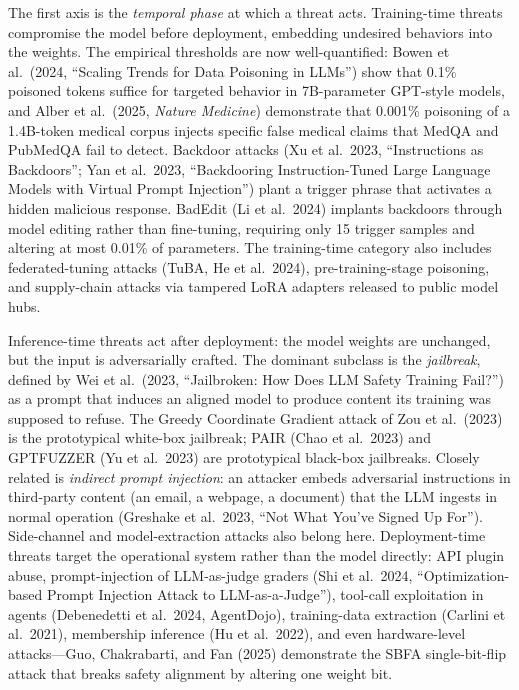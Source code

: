 The first axis is the \emph{temporal phase} at which a threat acts. Training-time threats compromise the model before deployment, embedding undesired behaviors into the weights. The empirical thresholds are now well-quantified: Bowen et al.~(2024, ``Scaling Trends for Data Poisoning in LLMs'') show that 0.1\% poisoned tokens suffice for targeted behavior in 7B-parameter GPT-style models, and Alber et al.~(2025, \emph{Nature Medicine}) demonstrate that 0.001\% poisoning of a 1.4B-token medical corpus injects specific false medical claims that MedQA and PubMedQA fail to detect. Backdoor attacks (Xu et al.~2023, ``Instructions as Backdoors''; Yan et al.~2023, ``Backdooring Instruction-Tuned Large Language Models with Virtual Prompt Injection'') plant a trigger phrase that activates a hidden malicious response. BadEdit (Li et al.~2024) implants backdoors through model editing rather than fine-tuning, requiring only 15 trigger samples and altering at most 0.01\% of parameters. The training-time category also includes federated-tuning attacks (TuBA, He et al.~2024), pre-training-stage poisoning, and supply-chain attacks via tampered LoRA adapters released to public model hubs.

Inference-time threats act after deployment: the model weights are unchanged, but the input is adversarially crafted. The dominant subclass is the \emph{jailbreak}, defined by Wei et al.~(2023, ``Jailbroken: How Does LLM Safety Training Fail?'') as a prompt that induces an aligned model to produce content its training was supposed to refuse. The Greedy Coordinate Gradient attack of Zou et al.~(2023) is the prototypical white-box jailbreak; PAIR (Chao et al.~2023) and GPTFUZZER (Yu et al.~2023) are prototypical black-box jailbreaks. Closely related is \emph{indirect prompt injection}: an attacker embeds adversarial instructions in third-party content (an email, a webpage, a document) that the LLM ingests in normal operation (Greshake et al.~2023, ``Not What You've Signed Up For''). Side-channel and model-extraction attacks also belong here. Deployment-time threats target the operational system rather than the model directly: API plugin abuse, prompt-injection of LLM-as-judge graders (Shi et al.~2024, ``Optimization-based Prompt Injection Attack to LLM-as-a-Judge''), tool-call exploitation in agents (Debenedetti et al.~2024, AgentDojo), training-data extraction (Carlini et al.~2021), membership inference (Hu et al.~2022), and even hardware-level attacks---Guo, Chakrabarti, and Fan (2025) demonstrate the SBFA single-bit-flip attack that breaks safety alignment by altering one weight bit.

